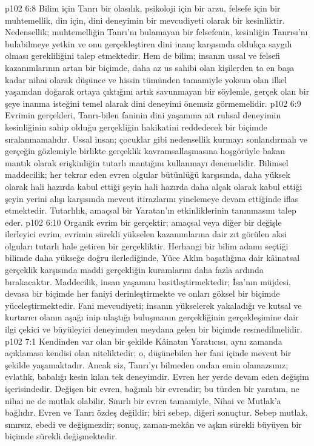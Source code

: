 \vs p102 6:8 Bilim için Tanrı bir olasılık, psikoloji için bir arzu, felsefe için bir muhtemellik, din için, dini deneyimin bir mevcudiyeti olarak bir kesinliktir. Nedensellik; muhtemelliğin Tanrı’nı bulamayan bir felsefenin, kesinliğin Tanrısı’nı bulabilmeye yetkin ve onu gerçekleştiren dini inanç karşısında oldukça saygılı olması gerekliliğini talep etmektedir. Hem de bilim; insanın ussal ve felsefi kazanımlarının artan bir biçimde, daha az us sahibi olan kişilerden ta en başa kadar nihai olarak düşünce ve hissin tümünden tamamiyle yoksun olan ilkel yaşamdan doğarak ortaya çıktığını artık savunmayan bir söylemle, gerçek olan bir şeye inanma isteğini temel alarak dini deneyimi önemsiz görmemelidir.
\vs p102 6:9 Evrimin gerçekleri, Tanrı\hyp{}bilen faninin dini yaşamına ait ruhsal deneyimin kesinliğinin sahip olduğu gerçekliğin hakikatini reddedecek bir biçimde sıralanmamalıdır. Ussal insan; çocuklar gibi nedensellik kurmayı sonlandırmalı ve gerçeğin gözlemiyle birlikte gerçeklik kavramsallaşmasına hoşgörüyle bakan mantık olarak erişkinliğin tutarlı mantığını kullanmayı denemelidir. Bilimsel maddecilik; her tekrar eden evren olgular bütünlüğü karşısında, daha yüksek olarak hali hazırda kabul ettiği şeyin hali hazırda daha alçak olarak kabul ettiği şeyin yerini alışı karşısında mevcut itirazlarını yinelemeye devam ettiğinde iflas etmektedir. Tutarlılık, amaçsal bir Yaratan’ın etkinliklerinin tanınmasını talep eder.
\vs p102 6:10 Organik evrim bir gerçektir; amaçsal veya diğer bir değişle ilerleyici evrim, evrimin sürekli yükselen kazanımlarına dair zıt görülen aksi olguları tutarlı hale getiren bir gerçekliktir. Herhangi bir bilim adamı seçtiği bilimde daha yükseğe doğru ilerlediğinde, Yüce Aklın başatlığına dair kâinatsal gerçeklik karşısında maddi gerçekliğin kuramlarını daha fazla ardında bırakacaktır. Maddecilik, insan yaşamını basitleştirmektedir; İsa’nın müjdesi, devasa bir biçimde her faniyi derinleştirmekte ve onları göksel bir biçimde yüceleştirmektedir. Fani mevcudiyeti; insanın yükselerek yakaladığı ve kutsal ve kurtarıcı olanın aşağı inip ulaştığı buluşmanın gerçekliğinin gerçekleşimine dair ilgi çekici ve büyüleyici deneyimden meydana gelen bir biçimde resmedilmelidir.
\vs p102 7:1 Kendinden var olan bir şekilde Kâinatın Yaratıcısı, aynı zamanda açıklaması kendisi olan niteliktedir; o, düşünebilen her fani içinde mevcut bir şekilde yaşamaktadır. Ancak siz, Tanrı’yı bilmeden ondan emin olamazsınız; evlatlık, babalığı kesin kılan tek deneyimdir. Evren her yerde devam eden değişim içerisindedir. Değişen bir evren, bağımlı bir evrendir; bu türden bir yaratım, ne nihai ne de mutlak olabilir. Sınırlı bir evren tamamiyle, Nihai ve Mutlak’a bağlıdır. Evren ve Tanrı özdeş değildir; biri sebep, diğeri sonuçtur. Sebep mutlak, sınırsız, ebedi ve değişmezdir; sonuç, zaman\hyp{}mekân ve aşkın sürekli büyüyen bir biçimde sürekli değişmektedir.
